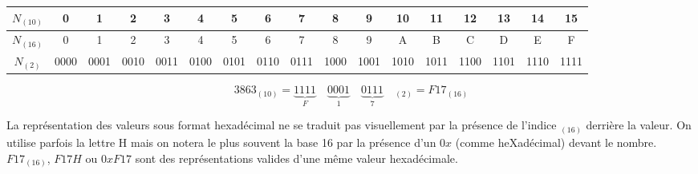 \documentclass[10pt,fleqn]{article} %
\begin{document}
\footnotesize{\begin{center}
\begin{tabular}{|c|c|c|c|c|c|c|c|c|c|c|c|c|c|c|c|c|}
\hline 
$N_{(10)}$ & 
0	&
1	&
2	&
3	&
4	&
5	&
6	&
7	&
8	&
9	&
10	&
11	&
12	&
13	&
14	&
15 \\
\hline
$N_{(16)}$ &
0	&
1	&
2	&
3	&
4	&
5	&
6	&
7	&
8	&
9	&
A	&
B	&
C	&
D	&
E	&
F\\
\hline
$N_{(2)}$ & 
 0000	&
 0001	&
 0010	&
 0011	&
 0100	&
 0101	&
 0110	&
 0111	&
 1000	&
 1001	&
 1010	&
 1011	&
 1100	&
 1101	&
 1110	&
 1111\\
\hline
\end{tabular}
\end{center}}

\begin{exemple}
$$
3863_{(10)} = 
\underbrace{1111}_{F} \quad 
\underbrace{0001}_{1} \quad 
\underbrace{0111}_{7} \quad_{(2)}=F17_{(16)}
$$

\end{exemple}
\normalsize
\begin{rem}
La représentation des valeurs sous format hexadécimal ne se traduit pas visuellement par la présence de l’indice $_{(16)}$ derrière la valeur. On utilise parfois la lettre H mais on notera le plus souvent la base 16 par la présence d’un $0x$ (comme heXadécimal) devant le nombre. 
$F17_{(16)}$, $F17H$ ou $0xF17$ sont des représentations valides d’une même valeur hexadécimale.

\end{rem}






\begin{thebibliography}{2}
\end{thebibliography}
\end{document}
